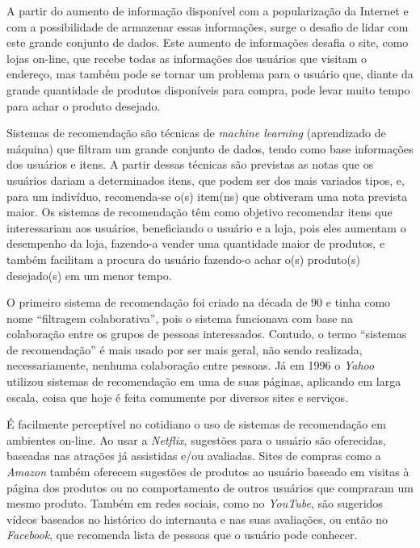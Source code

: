 \documentclass[12pt,a4paper,header]{abnt}
\begin{document}
A partir do aumento de informação disponível com a popularização da Internet e com a possibilidade de armazenar essas informações, surge o desafio de lidar com este grande conjunto de dados\cite{isinkaye2015recommendation}. Este aumento de informações desafia o site, como lojas on-line, que recebe todas as informações dos usuários que visitam o endereço, mas também pode se tornar um problema para o usuário que, diante da grande quantidade de produtos disponíveis para compra, pode levar muito tempo para achar o produto desejado\cite{mild2002collaborative}.

Sistemas de recomendação são técnicas de \textit{machine learning} (aprendizado de máquina) que filtram um grande conjunto de dados, tendo como base informações dos usuários e itens\cite{takahashi2015estudo}. A partir dessas técnicas são previstas as notas que os usuários dariam a determinados itens, que podem ser dos mais variados tipos, e, para um indivíduo, recomenda-se o(s) item(ns) que obtiveram uma nota prevista maior\cite{shapira2011recommender}. Os sistemas de recomendação têm como objetivo recomendar itens que interessariam aos usuários\cite{melville2011recommender}, beneficiando o usuário e a loja, pois eles aumentam o desempenho da loja, fazendo-a vender uma quantidade maior de produtos, e também facilitam a procura do usuário fazendo-o achar o(s) produto(s) desejado(s) em um menor tempo\cite{isinkaye2015recommendation}. 

O primeiro sistema de recomendação foi criado na década de $90$ e tinha como nome ``filtragem colaborativa'', pois o sistema funcionava com base na colaboração entre os grupos de pessoas interessados. Contudo, o termo ``sistemas de recomendação'' é mais usado por ser mais geral, não sendo realizada, necessariamente, nenhuma colaboração entre pessoas\cite{reategui2005sistemas}. Já em 1996 o \textit{Yahoo} utilizou sistemas de recomendação em uma de suas páginas, aplicando em larga escala\cite{reategui2005sistemas}, coisa que hoje é feita comumente por diversos sites e serviços.

É facilmente perceptível no cotidiano o uso de sistemas de recomendação em ambientes on-line. Ao usar a \textit{Netflix}, sugestões para o usuário são oferecidas, baseadas nas atrações já assistidas e/ou avaliadas. Sites de compras como a \textit{Amazon} também oferecem sugestões de produtos ao usuário baseado em visitas à página dos produtos ou no comportamento de outros usuários que compraram um mesmo produto. Também em redes sociais, como no \textit{YouTube}, são sugeridos vídeos baseados no histórico do internauta e nas suas avaliações, ou então no \textit{Facebook}, que recomenda lista de pessoas que o usuário pode conhecer\cite{gorakala2015building}.
\end{document}
